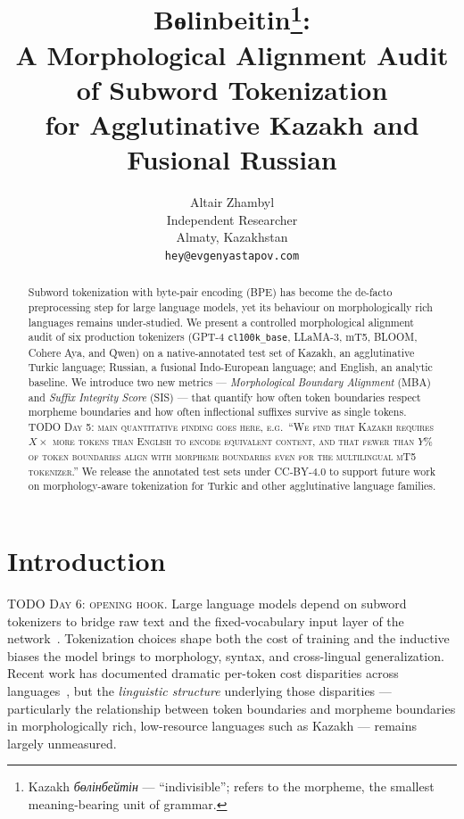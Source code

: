 \documentclass{article}
\title{
  Bөlinbeitin\footnote{Kazakh \emph{бөлінбейтін} — ``indivisible''; refers to the morpheme,
  the smallest meaning-bearing unit of grammar.}: \\
  A Morphological Alignment Audit of Subword Tokenization \\
  for Agglutinative Kazakh and Fusional Russian
}
\author{
  Altair Zhambyl \\
  Independent Researcher \\
  Almaty, Kazakhstan \\
  \texttt{hey@evgenyastapov.com}
}
\begin{document}
\maketitle

\begin{abstract}
Subword tokenization with byte-pair encoding (BPE) has become the de-facto preprocessing
step for large language models, yet its behaviour on morphologically rich languages
remains under-studied. We present a controlled morphological alignment audit of six
production tokenizers (GPT-4 \texttt{cl100k\_base}, LLaMA-3, mT5, BLOOM, Cohere Aya,
and Qwen) on a native-annotated test set of Kazakh, an agglutinative Turkic language;
Russian, a fusional Indo-European language; and English, an analytic baseline.
We introduce two new metrics --- \emph{Morphological Boundary Alignment} (MBA) and
\emph{Suffix Integrity Score} (SIS) --- that quantify how often token boundaries
respect morpheme boundaries and how often inflectional suffixes survive as single
tokens. \textsc{TODO Day 5: main quantitative finding goes here, e.g.\
``We find that Kazakh requires \(X\times\) more tokens than English to encode equivalent
content, and that fewer than \(Y\%\) of token boundaries align with morpheme boundaries
even for the multilingual mT5 tokenizer.''} We release the annotated test sets under
CC-BY-4.0 to support future work on morphology-aware tokenization for Turkic and
other agglutinative language families.
\end{abstract}

\section{Introduction}
\label{sec:intro}


\textsc{TODO Day 6: opening hook.}
Large language models depend on subword tokenizers to bridge raw text and the
fixed-vocabulary input layer of the network~\citep{sennrich2016bpe}.
Tokenization choices shape both the cost of training and the inductive biases
the model brings to morphology, syntax, and cross-lingual generalization.
Recent work has documented dramatic per-token cost disparities across
languages~\citep{petrov2023tokenizer, ahia2023languages},
but the \emph{linguistic structure} underlying those disparities --- particularly
the relationship between token boundaries and morpheme boundaries in
morphologically rich, low-resource languages such as Kazakh --- remains largely
unmeasured.
\end{document}
